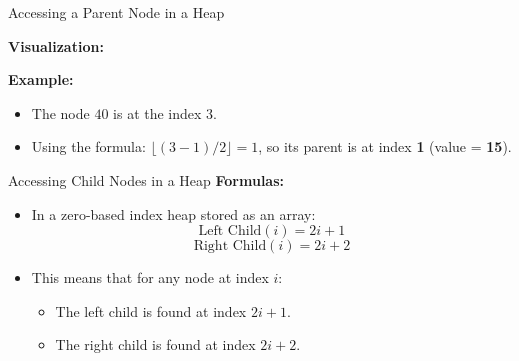 \begin{frame}{Accessing a Parent Node in a Heap}
      
    \textbf{Visualization:}
    \begin{center}
    \end{center}

    
    \textbf{Example:}
    \begin{itemize}
        \item The node \( 40 \) is at the index \( 3 \).
        \item Using the formula: \(\lfloor (3-1)/2 \rfloor = 1 \), so its parent is at index \textbf{1} (value = \textbf{15}).
    \end{itemize}
\end{frame}

\begin{frame}{Accessing Child Nodes in a Heap}
    \textbf{Formulas:}
    \begin{itemize}
        \item In a zero-based index heap stored as an array:
        \[
        \text{Left Child}(i) = 2i + 1
        \]
        \[
        \text{Right Child}(i) = 2i + 2
        \]
        \item This means that for any node at index \( i \):
        \begin{itemize}
            \item The left child is found at index \( 2i + 1 \).
            \item The right child is found at index \( 2i + 2 \).
        \end{itemize}
    \end{itemize}

    \vspace{0.5cm}
    
\end{frame}

